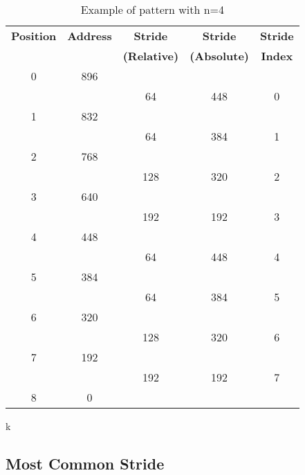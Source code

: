 \begin{table}
	\caption{Example of pattern with n=4}
	\label{table:pattern}
	\centering
	\begin{tabular}{c|c|c|c|c}
		\bfseries Position &
		\bfseries Address &
		\bfseries Stride &
		\bfseries Stride &
		\bfseries Stride \\
		& &
		\bfseries (Relative) &
		\bfseries (Absolute) &
		\bfseries Index \\
		\hline
		0 & 896   & & \\
		  &	& 64 & 448 & 0 \\
		1 & 832  & & \\
		  & & 64 & 384 & 1 \\
		2 & 768 & & \\
		  & & 128 & 320 & 2 \\
		3 & 640 & & \\
		  & & 192 & 192 & 3 \\
		4 & 448 & & \\
		  &	& 64 & 448 & 4 \\
		5 & 384 & & \\
		  &	& 64 & 384 & 5 \\
		6 & 320 & & \\
		  &	& 128 & 320 & 6 \\
		7 & 192 & & \\
		  &	& 192 & 192 & 7 \\
		8 & 0 & & \\
	\end{tabular}
\end{table}

k\subsection{Most Common Stride}

